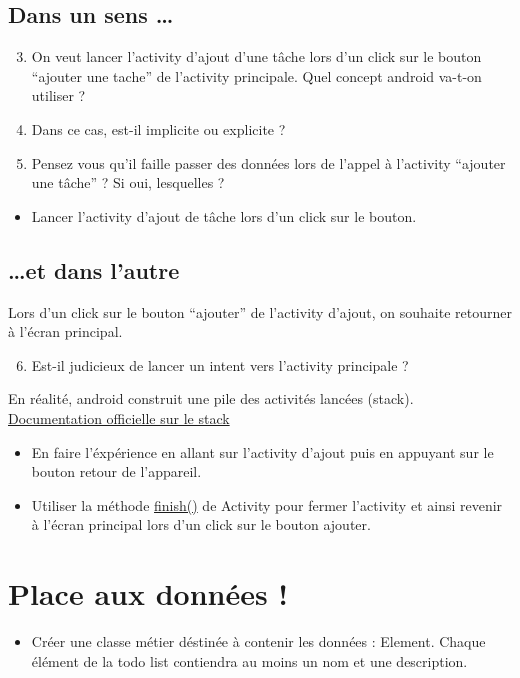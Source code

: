\documentclass{article}
\begin{document}
\subsection{Dans un sens \ldots}
\begin{enumerate}
 \setcounter{enumi}{2}
\item On veut lancer l'activity d'ajout d'une tâche lors d'un click sur le
bouton ``ajouter une tache'' de l'activity principale.
Quel concept android va-t-on utiliser ?
\item Dans ce cas, est-il implicite ou explicite ?
\item Pensez vous qu'il faille passer des données lors de l'appel à l'activity ``ajouter une tâche'' ? Si oui, lesquelles ?
\end{enumerate}
\begin{itemize}
  \item Lancer l'activity d'ajout de tâche lors d'un click sur le bouton.
\end{itemize}
\subsection{\ldots et dans l'autre}

Lors d'un click sur le bouton ``ajouter'' de l'activity d'ajout, on souhaite retourner à l'écran principal.
 \begin{enumerate}
 \setcounter{enumi}{5}
\item Est-il judicieux de lancer un intent vers l'activity principale ? 
\end{enumerate}
 En réalité, android construit une pile des activités lancées (stack). \href{http://developer.android.com/guide/components/tasks-and-back-stack.html}{Documentation officielle sur le stack} 
  \begin{itemize}
  \item En faire l'éxpérience en allant sur l'activity d'ajout puis en appuyant
  sur le bouton retour de l'appareil.
  \item Utiliser la méthode
  \href{http://developer.android.com/reference/android/app/Activity.html#finish()}{finish()} de Activity pour fermer l'activity et ainsi revenir à l'écran principal lors d'un click sur le bouton ajouter.
 \end{itemize}
 
 \section{Place aux données !}
 \begin{itemize}
  \item Créer une classe métier déstinée à contenir les données : Element.
  Chaque élément de la todo list contiendra au moins un nom et une description.
 \end{itemize}
\end{document}
